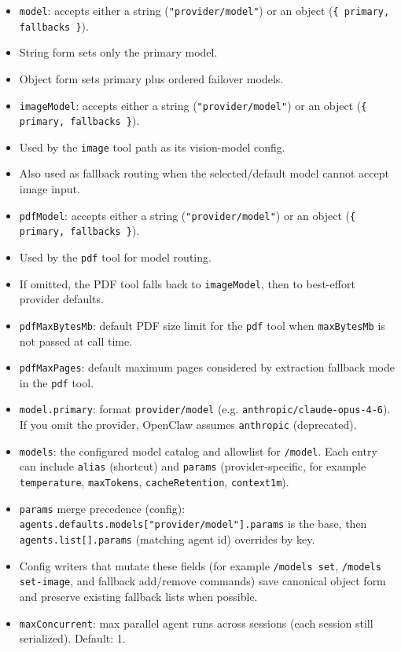 \begin{itemize}
  \item \texttt{model}: accepts either a string (\texttt{"provider/model"}) or an object (\texttt{\{ primary, fallbacks \}}).
  \item String form sets only the primary model.
  \item Object form sets primary plus ordered failover models.
  \item \texttt{imageModel}: accepts either a string (\texttt{"provider/model"}) or an object (\texttt{\{ primary, fallbacks \}}).
  \item Used by the \texttt{image} tool path as its vision-model config.
  \item Also used as fallback routing when the selected/default model cannot accept image input.
  \item \texttt{pdfModel}: accepts either a string (\texttt{"provider/model"}) or an object (\texttt{\{ primary, fallbacks \}}).
  \item Used by the \texttt{pdf} tool for model routing.
  \item If omitted, the PDF tool falls back to \texttt{imageModel}, then to best-effort provider defaults.
  \item \texttt{pdfMaxBytesMb}: default PDF size limit for the \texttt{pdf} tool when \texttt{maxBytesMb} is not passed at call time.
  \item \texttt{pdfMaxPages}: default maximum pages considered by extraction fallback mode in the \texttt{pdf} tool.
  \item \texttt{model.primary}: format \texttt{provider/model} (e.g. \texttt{anthropic/claude-opus-4-6}). If you omit the provider, OpenClaw assumes \texttt{anthropic} (deprecated).
  \item \texttt{models}: the configured model catalog and allowlist for \texttt{/model}. Each entry can include \texttt{alias} (shortcut) and \texttt{params} (provider-specific, for example \texttt{temperature}, \texttt{maxTokens}, \texttt{cacheRetention}, \texttt{context1m}).
  \item \texttt{params} merge precedence (config): \texttt{agents.defaults.models["provider/model"].params} is the base, then \texttt{agents.list[].params} (matching agent id) overrides by key.
  \item Config writers that mutate these fields (for example \texttt{/models set}, \texttt{/models set-image}, and fallback add/remove commands) save canonical object form and preserve existing fallback lists when possible.
  \item \texttt{maxConcurrent}: max parallel agent runs across sessions (each session still serialized). Default: 1.
\end{itemize}


